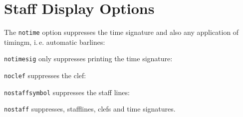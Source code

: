 \section*{Staff Display Options}

The \texttt{notime} option suppresses the time signature and also any
application of timingm, i.\,e. automatic barlines:


\texttt{notimesig} only suppresses printing the time signature:


\texttt{noclef} suppresses the clef:


\texttt{nostaffsymbol} suppresses the staff lines:


\texttt{nostaff} suppresses, stafflines, clefs and time signatures.

